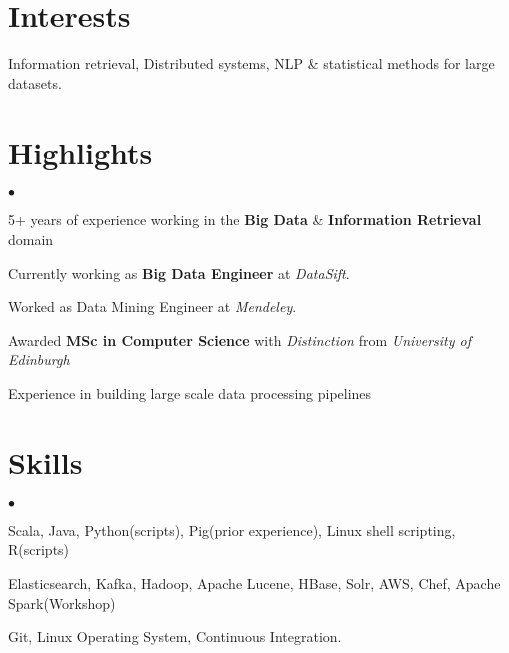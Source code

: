 \documentclass[margin,centered,11pt]{res}
\newenvironment{list2}{
  \begin{list}{$\bullet$}{%
      \setlength{\itemsep}{0in}
      \setlength{\parsep}{0in} \setlength{\parskip}{0in}
      \setlength{\topsep}{0in} \setlength{\partopsep}{0in} 
      \setlength{\leftmargin}{0.2in}}}{\end{list}}
\begin{document}

\begin{resume}

\section{\sc Interests}
Information retrieval, Distributed systems, NLP \& statistical methods for large datasets.

\section{\sc Highlights}
\vspace*{+.1in}
\begin{list2}
\item 5+ years of experience working in the \textbf{Big Data} \& \textbf{Information Retrieval} domain
\item Currently working as \textbf{Big Data Engineer} at \textit{DataSift}. 
\item Worked as Data Mining Engineer at \textit{Mendeley}. 
\item Awarded \textbf{MSc in Computer Science} with \textit{Distinction} from \textit{University of Edinburgh}
\item Experience in building large scale data processing pipelines
\end{list2}

\section{\sc Skills} 
\begin{list2}
\item Scala, Java, Python(scripts), Pig(prior experience), Linux shell scripting, R(scripts)
\item Elasticsearch, Kafka, Hadoop, Apache Lucene, HBase, Solr, AWS, Chef, Apache Spark(Workshop)
\item Git, Linux Operating System, Continuous Integration.
\end{list2}


\end{resume}
\end{document}
